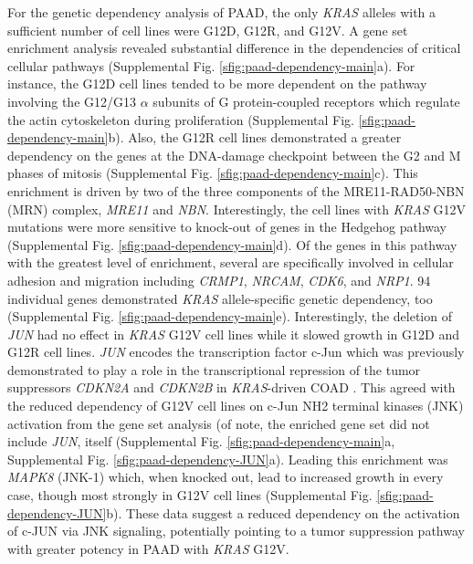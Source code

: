 \documentclass[english, 10pt, letterpaper]{article}
\newcommand{\KRAS}{\emph{KRAS}}
\begin{document}
For the genetic dependency analysis of PAAD, the only \KRAS{} alleles with a sufficient number of cell lines were G12D, G12R, and G12V.
A gene set enrichment analysis revealed substantial difference in the dependencies of critical cellular pathways (Supplemental Fig. \ref{sfig:paad-dependency-main}a).
For instance, the G12D cell lines tended to be more dependent on the pathway involving the G12/G13 $\alpha$ subunits of G protein-coupled receptors which regulate the actin cytoskeleton during proliferation \cite{Worzfeld2008G12/G13-mediatedDisease., Siehler2009RegulationReceptors., Suzuki2009RegulationPathways.} (Supplemental Fig. \ref{sfig:paad-dependency-main}b).
Also, the G12R cell lines demonstrated a greater dependency on the genes at the DNA-damage checkpoint between the G2 and M phases of mitosis (Supplemental Fig. \ref{sfig:paad-dependency-main}c).
This enrichment is driven by two of the three components of the MRE11-RAD50-NBN (MRN) complex, \emph{MRE11} and \emph{NBN}.
Interestingly, the cell lines with \KRAS{} G12V mutations were more sensitive to knock-out of genes in the Hedgehog pathway (Supplemental Fig. \ref{sfig:paad-dependency-main}d).
Of the genes in this pathway with the greatest level of enrichment, several are specifically involved in cellular adhesion and migration including \emph{CRMP1}, \emph{NRCAM}, \emph{CDK6}, and \emph{NRP1}.
94 individual genes demonstrated \KRAS{} allele-specific genetic dependency, too (Supplemental Fig. \ref{sfig:paad-dependency-main}e).
Interestingly, the deletion of \emph{JUN} had no effect in \KRAS{} G12V cell lines while it slowed growth in G12D and G12R cell lines.
\emph{JUN} encodes the transcription factor c-Jun which was previously demonstrated to play a role in the transcriptional repression of the tumor suppressors \emph{CDKN2A} and \emph{CDKN2B} in \KRAS{}-driven COAD \cite{Serra2014APhenotype.}.
This agreed with the reduced dependency of G12V cell lines on c-Jun NH2 terminal kinases (JNK) activation from the gene set analysis (of note, the enriched gene set did not include \emph{JUN}, itself (Supplemental Fig. \ref{sfig:paad-dependency-main}a, Supplemental Fig. \ref{sfig:paad-dependency-JUN}a).
Leading this enrichment was \emph{MAPK8} (JNK-1) which, when knocked out, lead to increased growth in every case, though most strongly in G12V cell lines (Supplemental Fig. \ref{sfig:paad-dependency-JUN}b).
These data suggest a reduced dependency on the activation of c-JUN via JNK signaling, potentially pointing to a tumor suppression pathway with greater potency in PAAD with \KRAS{} G12V.
\end{document}
